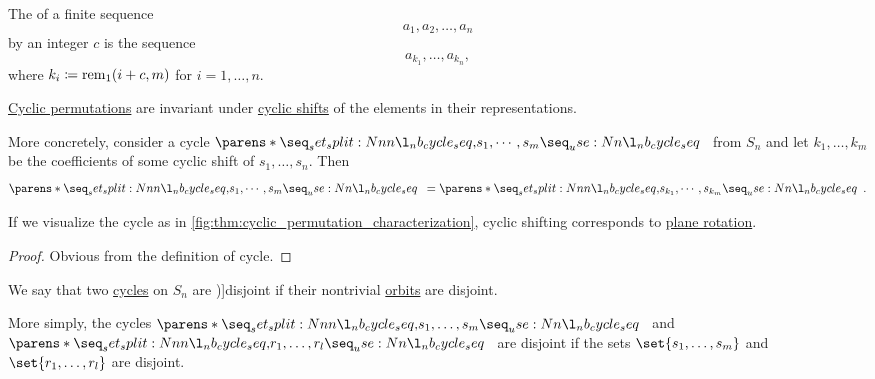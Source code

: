 \begin{definition}\label{def:cyclic_shift}\mimprovised
  The  of a finite sequence
  \begin{equation*}
    a_1, a_2, \ldots, a_n
  \end{equation*}
  by an integer \( c \) is the sequence
  \begin{equation*}
    a_{k_1}, \ldots, a_{k_n},
  \end{equation*}
  where \( k_i \coloneqq \operatorname{rem}_1(i + c, m) \) for \( i = 1, \ldots, n \).
\end{definition}

\begin{proposition}\label{thm:cyclic_permutation_cyclic_shift}
  \hyperref[def:cyclic_permutation]{Cyclic permutations} are invariant under \hyperref[def:cyclic_shift]{cyclic shifts} of the elements in their representations.

  More concretely, consider a cycle \( \cycle{ s_1, \cdots, s_m } \) from \( S_n \) and let \( k_1, \ldots, k_m \) be the coefficients of some cyclic shift of \( s_1, \ldots, s_n \). Then
  \begin{equation*}
    \cycle{ s_1, \cdots, s_m } = \cycle{ s_{k_1}, \cdots, s_{k_m} }.
  \end{equation*}
\end{proposition}
\begin{comments}
  \item If we visualize the cycle as in \cref{fig:thm:cyclic_permutation_characterization}, cyclic shifting corresponds to \hyperref[def:rigid_motion/rotation]{plane rotation}.
\end{comments}
\begin{proof}
  Obvious from the definition of cycle.
\end{proof}

\begin{definition}\label{def:disjoint_cycle}
  We say that two \hyperref[def:cyclic_permutation]{cycles} on \( S_n \) are \term[ru=независимые (\cite[sec. 4.3]{Тыртышников2007ЛинейнаяАлгебра})]{disjoint} if their nontrivial \hyperref[def:group_action_orbit]{orbits} are disjoint.
\end{definition}
\begin{comments}
  \item More simply, the cycles \( \cycle{ s_1, \ldots, s_m } \) and \( \cycle{ r_1, \ldots, r_l } \) are disjoint if the sets \( \set{ s_1, \ldots, s_m } \) and \( \set{ r_1, \ldots, r_l } \) are disjoint.
\end{comments}

